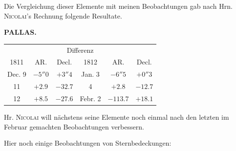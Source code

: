\par\indent Die Vergleichung dieser Elemente mit meinen Beobachtungen gab nach Hrn. \textsc{Nicolai}'s Rechnung folgende Resultate.
\clearpage
\thispagestyle{empty}
\noindent{}%
\makebox[12mm][l]{}%
\parbox[t]{\dimexpr\linewidth-24mm\relax}{\centering\footnotesize\bfseries PALLAS.\par}%
\par\nobreak\medskip
\begin{center}
\fontsize{10}{12}\selectfont\setlength{\tabcolsep}{3pt}\renewcommand{\arraystretch}{1.15}\begin{tabular}{c|c|c||c|c|c}
\multicolumn{6}{c}{Differenz}\\
1811 & AR. & Decl. & 1812 & AR. & Decl. \\
\hline
Dec. 9 & $-5''0$ & $+3''4$ & Jan. 3 & $-6''5$ & $+0''3$ \\
11 & $+2.9$ & $-32.7$ & 4 & $+2.8$ & $-12.7$ \\
12 & $+8.5$ & $-27.6$ & Febr. 2 & $-113.7$ & $+18.1$ \\
\end{tabular}
\end{center}

\par\indent Hr. \textsc{Nicolai} will nächstens seine Elemente noch einmal nach den letzten im Februar gemachten
Beobachtungen verbessern.

\par\indent Hier noch einige Beobachtungen von Sternbedeckungen:

